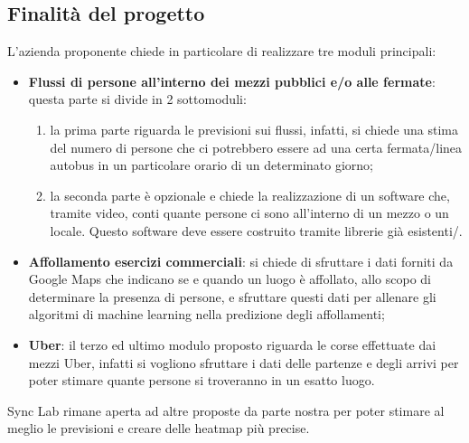 \documentclass[../studio-di-fattibilita.tex]{subfiles}
\begin{document}
\subsection{Finalità del progetto}%
\label{sub:c3_finalita_del_progetto}
L’azienda proponente chiede in particolare di realizzare tre moduli principali:
\begin{itemize}
  \item \textbf{Flussi di persone all’interno dei mezzi pubblici e/o alle fermate}: questa parte si divide in 2 sottomoduli:
  \begin{enumerate}
    \item la prima parte riguarda le previsioni sui flussi, infatti, si chiede una stima del numero di persone che ci potrebbero essere ad una certa fermata/linea autobus in un particolare orario di un determinato giorno;
    \item la seconda parte è opzionale e chiede la realizzazione di un software che, tramite video, conti quante persone ci sono all'interno di un mezzo o un locale. Questo software deve essere costruito tramite librerie già esistenti/.
  \end{enumerate}
  \item \textbf{Affollamento esercizi commerciali}: si chiede di sfruttare i dati forniti da Google Maps che indicano se e quando un luogo è affollato, allo scopo di determinare la presenza di persone, e sfruttare questi dati per allenare gli algoritmi di machine learning nella predizione degli affollamenti;
  \item \textbf{Uber}: il terzo ed ultimo modulo proposto riguarda le corse effettuate dai mezzi Uber, infatti si vogliono sfruttare i dati delle partenze e degli arrivi per poter stimare quante persone si troveranno in un esatto luogo.
\end{itemize}
Sync Lab rimane aperta ad altre proposte da parte nostra per poter stimare al meglio le previsioni e creare delle heatmap più precise.
\end{document}
